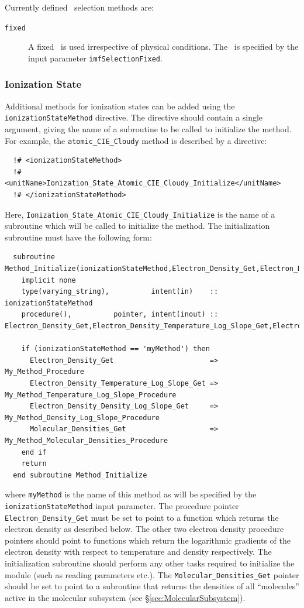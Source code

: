 Currently defined \IMF\ selection methods are:
\begin{description}
 \item [{\tt fixed}] A fixed \IMF\ is used irrespective of physical conditions. The \IMF\ is specified by the input parameter {\tt imfSelectionFixed}.
\end{description}

\subsubsection{Ionization State}\label{sec:IonizationStateMethods}

Additional methods for ionization states can be added using the {\tt ionizationStateMethod} directive. The directive should contain a single argument, giving the name of a subroutine to be called to initialize the method. For example, the {\tt atomic\_CIE\_Cloudy} method is described by a directive:
\begin{verbatim}
  !# <ionizationStateMethod>
  !#  <unitName>Ionization_State_Atomic_CIE_Cloudy_Initialize</unitName>
  !# </ionizationStateMethod>
\end{verbatim}
Here, {\tt Ionization\_State\_Atomic\_CIE\_Cloudy\_Initialize} is the name of a subroutine which will be called to initialize the method. The initialization subroutine must have the following form:
\begin{verbatim}
  subroutine Method_Initialize(ionizationStateMethod,Electron_Density_Get,Electron_Density_Temperature_Log_Slope_Get,Electron_Density_Density_Log_Slope_Get,Molecular_Densities_Get)
    implicit none
    type(varying_string),          intent(in)    :: ionizationStateMethod
    procedure(),          pointer, intent(inout) :: Electron_Density_Get,Electron_Density_Temperature_Log_Slope_Get,Electron_Density_Density_Log_Slope_Get
    
    if (ionizationStateMethod == 'myMethod') then
      Electron_Density_Get                       => My_Method_Procedure
      Electron_Density_Temperature_Log_Slope_Get => My_Method_Temperature_Log_Slope_Procedure
      Electron_Density_Density_Log_Slope_Get     => My_Method_Density_Log_Slope_Procedure
      Molecular_Densities_Get                    => My_Method_Molecular_Densities_Procedure
    end if
    return
  end subroutine Method_Initialize
\end{verbatim}
where {\tt myMethod} is the name of this method as will be specified by the {\tt ionizationStateMethod} input parameter. The procedure pointer {\tt Electron\_Density\_Get} must be set to point to a function which returns the electron density as described below. The other two electron density procedure pointers should point to functions which return the logarithmic gradients of the electron density with respect to temperature and density respectively. The initialization subroutine should perform any other tasks required to initialize the module (such as reading parameters etc.). The {\tt Molecular\_Densities\_Get} pointer should be set to point to a subroutine that returns the densities of all ``molecules'' active in the molecular subsystem (see \S\ref{sec:MolecularSubsystem}).

